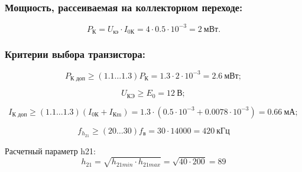   \begin{equation}
  \label{eq:equation6_9}
   
  \end{equation}
  
  \subsubsection{Мощность, рассеиваемая на коллекторном переходе:} %

  \begin{equation}
  \label{eq:equation6_10}
    P_{\text{К}} = U_{\text{кэ}} \cdot I_{\text{0К}} = 4 \cdot 0.5 \cdot 10^{-3} = 2~\text{мВт}. 
  \end{equation}
  

  \subsubsection{Критерии выбора транзистора:} %

  \begin{equation}
  \label{eq:equation6_11}
    P_{\text{К доп}} \geq (1.1 \ldots 1.3) P_{\text{К}} = 1.3 \cdot 2 \cdot 10^{-3} = 2.6~\text{мВт};
  \end{equation} 

  \begin{equation}
   \label{eq:equation6_12}
     U_{\text{КЭ}} \geq E_0 = 12~\text{В};
  \end{equation} 

  \begin{equation}
  \label{eq:equation6_13}
    I_{\text{К доп}} \geq (1.1 \ldots 1.3)(I_{\text{0К}} + I_{\text{Кm}}) = 1.3 \cdot (0.5 \cdot 10^{-3} + 0.0078 \cdot 10^{-3}) = 0.66~\text{мА}; 
  \end{equation} 

  \begin{equation}
   \label{eq:equation6_14}
     f_{h_{21}} \geq (20 \ldots 30) f_{\text{в}} = 30 \cdot 14000 = 420~\text{кГц}
  \end{equation} 

Расчетный параметр h21:
\begin{equation}
   \label{eq:equation6_15}
h_{21}=\sqrt{h_{21min} \cdot h_{21max}}=\sqrt{40 \cdot 200}=89
\end{equation} 

